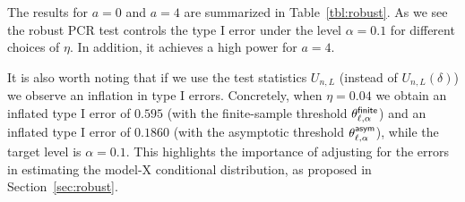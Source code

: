 \documentclass[11pt]{article}
\def\hP{\widehat{P}}
\begin{document}
The results for $a = 0$ and $a=4$ are summarized in Table~\ref{tbl:robust}. As we see the robust PCR test controls the type I error under the level $\alpha = 0.1$ for different choices of $\eta$. In addition, it achieves a high power for $a = 4$.
 
It is also worth noting that if we use the test statistics $U_{n,L}$ (instead of $U_{n,L}(\delta)$) we observe an inflation in type I errors. Concretely, when $\eta= 0.04$ we obtain an inflated type I error of $0.595$ (with the finite-sample threshold $\theta^{\mathsf{finite}}_{\ell,\alpha}$) and an inflated type I error of  $0.1860$ (with the asymptotic threshold $\theta^{\mathsf{asym}}_{\ell,\alpha}$), while the target level is $\alpha = 0.1$. This highlights the importance of adjusting for the errors in estimating the model-X conditional distribution, as proposed in Section~\ref{sec:robust}.

	
	
	
\end{document}

